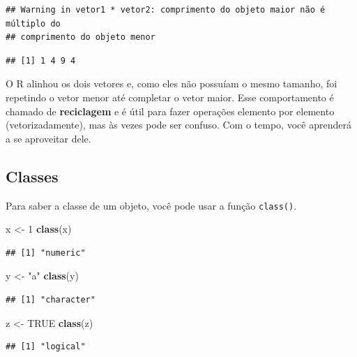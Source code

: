 \documentclass[
]{book}
\newenvironment{Shaded}{\begin{snugshade}}{\end{snugshade}}
\newcommand{\DecValTok}[1]{\textcolor[rgb]{0.00,0.00,0.81}{#1}}
\newcommand{\KeywordTok}[1]{\textcolor[rgb]{0.13,0.29,0.53}{\textbf{#1}}}
\newcommand{\NormalTok}[1]{#1}
\newcommand{\OtherTok}[1]{\textcolor[rgb]{0.56,0.35,0.01}{#1}}
\newcommand{\StringTok}[1]{\textcolor[rgb]{0.31,0.60,0.02}{#1}}
\begin{document}
\begin{verbatim}
## Warning in vetor1 * vetor2: comprimento do objeto maior não é múltiplo do
## comprimento do objeto menor
\end{verbatim}

\begin{verbatim}
## [1] 1 4 9 4
\end{verbatim}

O R alinhou os dois vetores e, como eles não possuíam o mesmo tamanho, foi repetindo o vetor menor até completar o vetor maior. Esse comportamento é chamado de \textbf{reciclagem} e é útil para fazer operações elemento por elemento (vetorizadamente), mas às vezes pode ser confuso. Com o tempo, você aprenderá a se aproveitar dele.

\hypertarget{classes}{%
\subsection{Classes}\label{classes}}

Para saber a classe de um objeto, você pode usar a função \texttt{class()}.

\begin{Shaded}
\begin{Highlighting}[]
\NormalTok{x <{-}}\StringTok{ }\DecValTok{1}
\KeywordTok{class}\NormalTok{(x)}
\end{Highlighting}
\end{Shaded}

\begin{verbatim}
## [1] "numeric"
\end{verbatim}

\begin{Shaded}
\begin{Highlighting}[]
\NormalTok{y <{-}}\StringTok{ "a"}
\KeywordTok{class}\NormalTok{(y)}
\end{Highlighting}
\end{Shaded}

\begin{verbatim}
## [1] "character"
\end{verbatim}

\begin{Shaded}
\begin{Highlighting}[]
\NormalTok{z <{-}}\StringTok{ }\OtherTok{TRUE}
\KeywordTok{class}\NormalTok{(z)}
\end{Highlighting}
\end{Shaded}

\begin{verbatim}
## [1] "logical"
\end{verbatim}
\end{document}
